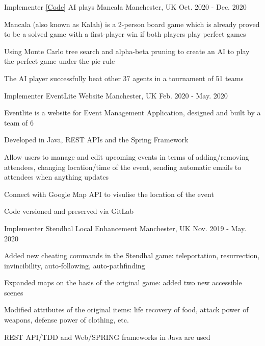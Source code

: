 \begin{cventries}
  \cventry
    {Implementer \href{https://github.com/Redcxx/KalahPlayer}{[Code]}} %
    {AI plays Mancala} %
    {Manchester, UK} %
    {Oct. 2020 - Dec. 2020} %
    {
      \begin{cvitems} %
        \item {Mancala (also known as Kalah) is a 2-person board game which is already proved to be a solved game with a first-player win if both players play perfect games}
        \item {Using Monte Carlo tree search and alpha-beta pruning to create an AI to play the perfect game under the pie rule}
        \item {The AI player successfully beat other 37 agents in a tournament of 51 teams}
      \end{cvitems}
    }

  \cventry
    {Implementer} %
    {EventLite Website} %
    {Manchester, UK} %
    {Feb. 2020 - May. 2020} %
    {
      \begin{cvitems} %
        \item {Eventlite is a website for Event Management Application, designed and built by a team of 6}
        \item {Developed in Java, REST APIs and the Spring Framework}
        \item {Allow users to manage and edit upcoming events in terms of adding/removing attendees, changing location/time of the event, sending automatic emails to attendees when anything updates}
        \item {Connect with Google Map API to visulise the location of the event}
        \item {Code versioned and preserved via GitLab}
      \end{cvitems}
    }

  \cventry
    {Implementer} %
    {Stendhal Local Enhancement} %
    {Manchester, UK} %
    {Nov. 2019 - May. 2020} %
    {
      \begin{cvitems} %
        \item {Added new cheating commands in the Stendhal game: teleportation, resurrection, invincibility, auto-following, auto-pathfinding}
        \item {Expanded maps on the basis of the original game: added two new accessible scenes}
        \item {Modified attributes of the original items: life recovery of food, attack power of weapons, defense power of clothing, etc.}
        \item {REST API/TDD and Web/SPRING frameworks in Java are used}
      \end{cvitems}
    }


\end{cventries}
